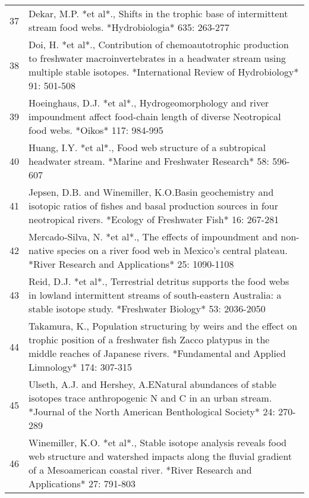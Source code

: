 \begin{table}[ht]
\begin{tabularx}{\textwidth}{rl}
   37 & Dekar, M.P. *et al*., Shifts in the trophic base of intermittent stream food webs. *Hydrobiologia* 635: 263-277 \\ 
   38 & Doi, H. *et al*., Contribution of chemoautotrophic production to freshwater macroinvertebrates in a headwater stream using multiple stable isotopes. *International Review of Hydrobiology* 91: 501-508 \\ 
   39 & Hoeinghaus, D.J. *et al*., Hydrogeomorphology and river impoundment affect food-chain length of diverse Neotropical food webs. *Oikos* 117: 984-995 \\ 
   40 & Huang, I.Y. *et al*., Food web structure of a subtropical headwater stream. *Marine and Freshwater Research* 58: 596-607 \\ 
   41 & Jepsen, D.B. and Winemiller, K.O.Basin geochemistry and isotopic ratios of fishes and basal production sources in four neotropical rivers. *Ecology of Freshwater Fish* 16: 267-281 \\ 
   42 & Mercado‐Silva, N. *et al*., The effects of impoundment and non-native species on a river food web in Mexico's central plateau. *River Research and Applications* 25: 1090-1108 \\ 
   43 & Reid, D.J. *et al*., Terrestrial detritus supports the food webs in lowland intermittent streams of south-eastern Australia: a stable isotope study. *Freshwater Biology* 53: 2036-2050 \\ 
   44 & Takamura, K., Population structuring by weirs and the effect on trophic position of a freshwater fish Zacco platypus in the middle reaches of Japanese rivers. *Fundamental and Applied Limnology* 174: 307-315 \\ 
   45 & Ulseth, A.J. and Hershey, A.ENatural abundances of stable isotopes trace anthropogenic N and C in an urban stream. *Journal of the North American Benthological Society* 24: 270-289 \\ 
   46 & Winemiller, K.O. *et al*., Stable isotope analysis reveals food web structure and watershed impacts along the fluvial gradient of a Mesoamerican coastal river. *River Research and Applications* 27: 791-803 \\ 
   \hline
\end{tabularx}
\endgroup
\end{table}
